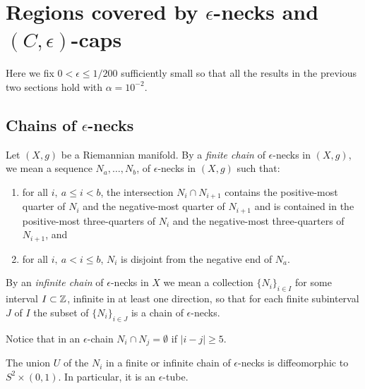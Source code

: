 \section{Regions covered by $\epsilon$-necks and
$(C,\epsilon)$-caps}


Here we fix $0<\epsilon\le 1/200$ sufficiently small so that all the
results in the previous two sections hold with $\alpha=10^{-2}$.

\subsection{Chains of $\epsilon$-necks}

\begin{definition}
\label{def:chain-of-epsilon-necks}

Let $(X,g)$ be a Riemannian manifold. By a {\em finite chain} of
$\epsilon$-necks in $(X,g)$, we mean a sequence $N_a,\ldots,N_{b}$,
of $\epsilon$-necks in $(X,g)$ such that: \begin{enumerate} \item
for all $i,\ a\le i<b$, the intersection $N_i\cap N_{i+1}$ contains
the positive-most quarter of $N_i$ and the negative-most quarter of
$N_{i+1}$ and is contained in the positive-most three-quarters of
$N_i$ and the negative-most three-quarters of $N_{i+1}$, and
\item  for all $i,\ a<i\le b$, $N_i$ is disjoint from the negative end of
$N_a$.
\end{enumerate}
By an {\em infinite chain} of $\epsilon$-necks in $X$ we mean a
collection $\{N_i\}_{i\in I}$ for some interval $I\subset \mathbb{Z}$,
infinite in at least one direction, so that for each finite
subinterval $J$ of $I$ the subset of $\{N_i\}_{i\in J}$ is a chain
of $\epsilon$-necks.
\end{definition}




Notice that in an $\epsilon$-chain $N_i\cap N_j=\emptyset$ if
$|i-j|\ge 5$.


\begin{lemma}
\label{lem:chain-union-diffeomorphic-cylinder}
\label{S2timesI}

The union $U$ of the $N_i$ in a finite or infinite chain of
$\epsilon$-necks is diffeomorphic to $S^2\times (0,1)$. In
particular, it is an $\epsilon$-tube.
\end{lemma}

